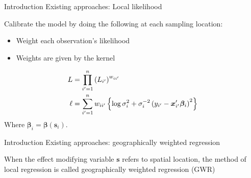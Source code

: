 \documentclass[12pt,t,handout]{beamer}
\newcommand{\subt}[1]{{\footnotesize \color{subtitle} {#1}}}
\begin{document}
\begin{frame}{Introduction}
\subt{Existing approaches: Local likelihood}

\bigskip
Calibrate the model by doing the following at each sampling location:
\begin{itemize}
    \item Weight each observation's likelihood
    \item Weights are given by the kernel
\end{itemize}

\begin{align}
    L &= \prod_{i'=1}^n \left(L_{i'}\right)^{w_{ii'}} \notag \\
    \ell &= \sum_{i'=1}^n w_{ii'} \left\{\log \sigma_i^{2} + \sigma_i^{-2}\left(y_{i'} - \bm{x}_{i'}'\bm{\beta}_i\right)^2 \right\} \notag
\end{align}
Where $\bm{\beta}_i = \bm{\beta}(\bm{s}_i)$.

\end{frame}



\begin{frame}{Introduction}
\subt{Existing approaches: geographically weighted regression}

\bigskip
When the effect modifying variable $\bm{s}$ refers to spatial location, the method of local regression is called geographically weighted regression (GWR) \citep{Brundson:1998a, Fotheringham:2002}

\end{frame}
\end{document}
